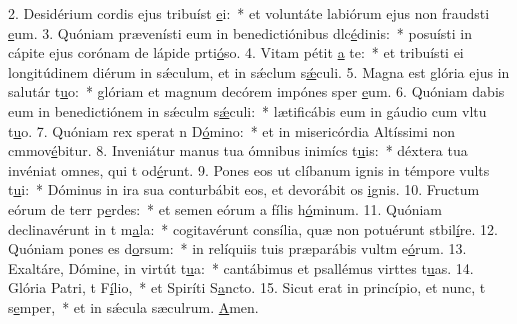 2. Desidérium cordis ejus tribuíst \uline{e}i:~* et voluntáte labiórum ejus non fraudsti \uline{e}um.
3. Quóniam prævenísti eum in benedictiónibus dlc\uline{é}dinis:~* posuísti in cápite ejus corónam de lápide prti\uline{ó}so.
4. Vitam pétit \uline{a} te:~* et tribuísti ei longitúdinem diérum in sǽculum, et in sǽclum s\uline{ǽ}culi.
5. Magna est glória ejus in salutár t\uline{u}o:~* glóriam et magnum decórem impónes sper \uline{e}um.
6. Quóniam dabis eum in benedictiónem in sǽculm s\uline{ǽ}culi:~* lætificábis eum in gáudio cum vltu t\uline{u}o.
7. Quóniam rex sperat n D\uline{ó}mino:~* et in misericórdia Altíssimi non cmmov\uline{é}bitur.
8. Inveniátur manus tua ómnibus inimícs t\uline{u}is:~* déxtera tua invéniat omnes, qui t od\uline{é}runt.
9. Pones eos ut clíbanum ignis in témpore vults t\uline{u}i:~* Dóminus in ira sua conturbábit eos, et devorábit os \uline{i}gnis.
10. Fructum eórum de terr p\uline{e}rdes:~* et semen eórum a fílis h\uline{ó}minum.
11. Quóniam declinavérunt in t m\uline{a}la:~* cogitavérunt consília, quæ non potuérunt stbil\uline{í}re.
12. Quóniam pones es d\uline{o}rsum:~* in relíquiis tuis præparábis vultm e\uline{ó}rum.
13. Exaltáre, Dómine, in virtút t\uline{u}a:~* cantábimus et psallémus virttes t\uline{u}as.
14. Glória Patri, t F\uline{í}lio,~* et Spiríti S\uline{a}ncto.
15. Sicut erat in princípio, et nunc, t s\uline{e}mper,~* et in sǽcula sæculrum. \uline{A}men.
